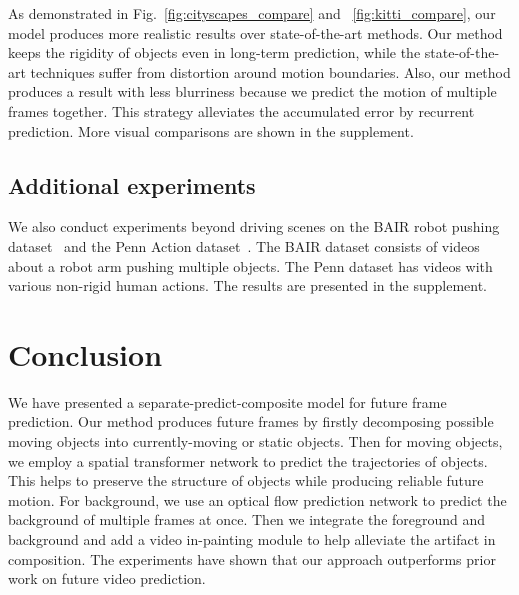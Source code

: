 \documentclass[10pt,twocolumn,letterpaper]{article}
\begin{document}
As demonstrated in Fig.~\ref{fig:cityscapes_compare} and ~\ref{fig:kitti_compare}, our model produces more realistic results over state-of-the-art methods. Our method keeps the rigidity of objects even in long-term prediction, while the state-of-the-art techniques suffer from distortion around motion boundaries. Also, our method produces a result with less blurriness because we predict the motion of multiple frames together. This strategy alleviates the accumulated error by recurrent prediction. More visual comparisons are shown in the supplement.


\subsection{Additional experiments}
We also conduct experiments beyond driving scenes on the BAIR robot pushing dataset~\cite{Finn2016} and the Penn Action dataset~\cite{penn_action}. The BAIR dataset consists of videos about a robot arm pushing multiple objects. The Penn dataset has videos with various non-rigid human actions. The results are presented in the supplement.




\section{Conclusion}
We have presented a separate-predict-composite model for future frame prediction. Our method produces future frames by firstly decomposing possible moving objects into currently-moving or static objects. Then for moving objects, we employ a spatial transformer network to predict the trajectories of objects. This helps to preserve the structure of objects while producing reliable future motion. For background, we use an optical flow prediction network to predict the background of multiple frames at once. Then we integrate the foreground and background and add a video in-painting module to help alleviate the artifact in composition. The experiments have shown that our approach outperforms prior work on future video prediction.

\clearpage
\newpage
\balance
{\small


}
\end{document}
